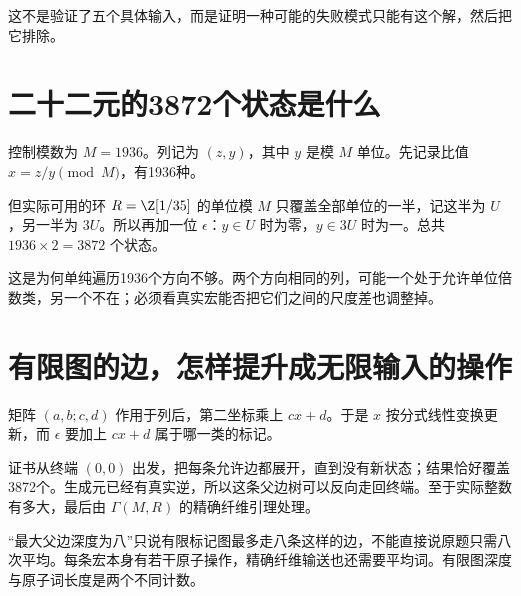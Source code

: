 这不是验证了五个具体输入，而是证明一种可能的失败模式只能有这个解，然后把它排除。

\section{二十二元的3872个状态是什么}
控制模数为 $M=1936$。列记为 $(z,y)$，其中 $y$ 是模 $M$ 单位。先记录比值 $x=z/y\pmod M$，有1936种。

但实际可用的环 $R=\Z[1/35]$ 的单位模 $M$ 只覆盖全部单位的一半，记这半为 $U$，另一半为 $3U$。所以再加一位 $\epsilon$：$y\in U$ 时为零，$y\in3U$ 时为一。总共 $1936\times2=3872$ 个状态。

这是为何单纯遍历1936个方向不够。两个方向相同的列，可能一个处于允许单位倍数类，另一个不在；必须看真实宏能否把它们之间的尺度差也调整掉。

\section{有限图的边，怎样提升成无限输入的操作}
矩阵 $(a,b;c,d)$ 作用于列后，第二坐标乘上 $cx+d$。于是 $x$ 按分式线性变换更新，而 $\epsilon$ 要加上 $cx+d$ 属于哪一类的标记。

证书从终端 $(0,0)$ 出发，把每条允许边都展开，直到没有新状态；结果恰好覆盖3872个。生成元已经有真实逆，所以这条父边树可以反向走回终端。至于实际整数有多大，最后由 $\Gamma(M,R)$ 的精确纤维引理处理。

“最大父边深度为八”只说有限标记图最多走八条这样的边，不能直接说原题只需八次平均。每条宏本身有若干原子操作，精确纤维输送也还需要平均词。有限图深度与原子词长度是两个不同计数。
